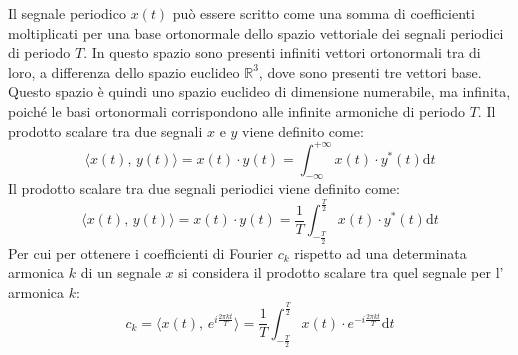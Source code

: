 \documentclass{article}
\newcommand{\df}{\mathrm{d}}
\numberwithin{equation}{subsection}
\begin{document}
Il segnale periodico $x(t)$ può essere scritto come una somma di coefficienti moltiplicati per una base ortonormale dello spazio vettoriale dei segnali periodici di periodo 
$T$. In questo spazio sono presenti infiniti vettori ortonormali tra di loro, a differenza dello spazio euclideo $\mathbb{R}^3$, dove sono presenti tre vettori base. Questo 
spazio è quindi uno spazio euclideo di dimensione numerabile, ma infinita, poiché le basi ortonormali corrispondono alle infinite armoniche di periodo $T$. 
Il prodotto scalare tra due segnali $x$ e $y$ viene definito come:
\begin{equation*}
    \langle x(t),\,y(t)\rangle=x(t)\cdot y(t)=\displaystyle\int_{-\infty}^{+\infty}x(t)\cdot y^*(t)\df t
\end{equation*}
Il prodotto scalare tra due segnali periodici viene definito come:
\begin{equation*}
    \langle x(t),\,y(t)\rangle=x(t)\cdot y(t)=\displaystyle\frac{1}{T}\int_{-\frac{T}{2}}^{\frac{T}{2}}x(t)\cdot y^*(t)\df t
\end{equation*}
Per cui per ottenere i coefficienti di Fourier $c_k$ rispetto ad una determinata armonica $k$ di un segnale $x$ si considera il prodotto scalare tra quel segnale per l'
armonica $k$:
\begin{equation}
    c_k=\langle x(t),\,e^{i\frac{2\pi  k t}{T}}\rangle=\displaystyle\frac{1}{T}\int_{-\frac{T}{2}}^{\frac{T}{2}}x(t)\cdot e^{-i\frac{2\pi  k t}{T}}\df t
\end{equation} 
\end{document}
